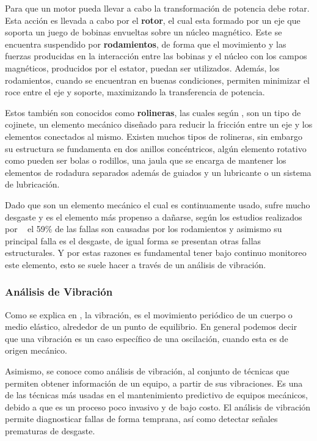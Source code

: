 Para que un motor pueda llevar a cabo la transformación de potencia debe rotar.
Esta acción es llevada a cabo por el \textbf{rotor}, el cual esta formado por un
eje que soporta un juego de bobinas envueltas sobre un núcleo magnético. Este
se encuentra suspendido por \textbf{rodamientos}, de forma que el movimiento y
las fuerzas producidas en la interacción entre las bobinas y el núcleo con los
campos magnéticos, producidos por el estator, puedan ser utilizados. Además,
los rodamientos, cuando se encuentran en buenas condiciones, permiten minimizar
el roce entre el eje y soporte, maximizando la transferencia de potencia.

Estos también son conocidos como \textbf{rolineras}, las cuales según
\cite{rodamiento},  son un tipo de cojinete,
un elemento mecánico diseñado para reducir la fricción entre un eje y los
elementos conectados al mismo. Existen muchos tipos de rolineras, sin embargo
su estructura se fundamenta en dos anillos concéntricos, algún elemento rotativo
como pueden ser bolas o rodillos, una jaula que se encarga de mantener los
elementos de rodadura separados además de guiados y un lubricante o un sistema
de lubricación.

Dado que son un elemento mecánico el cual es continuamente usado, sufre mucho
desgaste y es el elemento más propenso a dañarse, según los estudios realizados
por ~\textcite{Kammermann} el 59\% de las fallas son causadas por los rodamientos
y asimismo su principal falla es el desgaste, de igual forma se presentan
otras fallas estructurales. Y por estas razones es fundamental tener bajo continuo
monitoreo este elemento, esto se suele hacer a través de un análisis de vibración.


\subsubsection{Análisis de Vibración}

Como se explica en \Cite{wiki:Vibration}, la vibración, es el  movimiento
periódico de un cuerpo o medio
elástico, alrededor de un punto de equilibrio. En general podemos decir que una
vibración es un caso específico de una oscilación, cuando esta es de origen
mecánico.

Asimismo, se conoce como análisis de vibración, al conjunto de técnicas que permiten
obtener información de un equipo, a partir de sus vibraciones. Es una de las
técnicas más usadas en el mantenimiento predictivo de equipos mecánicos, debido
a que es un proceso poco invasivo y de bajo costo. El análisis de vibración
permite diagnosticar fallas de forma temprana, así como detectar señales
prematuras de desgaste.

